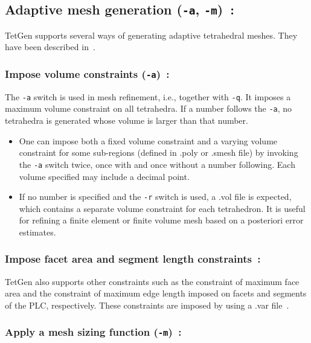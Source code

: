 \documentclass[12pt,twoside,a4paper]{article}
\numberwithin{equation}{section}
\newcommand{\tetq}{\texttt{-q}}
\newcommand{\tetr}{\texttt{-r}}
\newcommand{\teta}{\texttt{-a}}
\newcommand{\tetm}{\texttt{-m}}
\begin{document}
\subsection[Adaptive mesh generation]
{Adaptive mesh generation (\teta{}, \tetm{})~\cite[pp. 41--43]{Si2013}:}

TetGen supports several ways of generating adaptive tetrahedral meshes.
They have been described in~\cite[pp. 13--15]{Si2013}.

\subsubsection[Impose volume constraints]
{Impose volume constraints (\teta{})~\cite[pp. 41]{Si2013}:} 

The \teta{} switch is used in mesh refinement, i.e., together with
\tetq{}. It imposes a maximum volume constraint on all tetrahedra. If a
number follows the \teta{}, no tetrahedra is generated whose volume is
larger than that number.

\begin{itemize}
\item One can impose both a fixed volume constraint and a varying volume
  constraint for some sub-regions (defined in .poly or .smesh file) by
  invoking the \teta{} switch twice, once with and once without a number
  following. Each volume specified may include a decimal point.
\item If no number is specified and the \tetr{} switch is used, a .vol file
  is expected, which contains a separate volume constraint for each tetrahedron. It is useful for refining a finite element or finite volume mesh
  based on a posteriori error estimates.
\end{itemize}

\subsubsection[Impose facet area and segment length constraints]
{Impose facet area and segment length constraints~\cite[p. 42]{Si2013}:}

TetGen also supports other constraints such as the constraint of maximum
face area and the constraint of maximum edge length imposed on facets and
segments of the PLC, respectively.  These constraints are imposed by using a
.var file~\cite[p. 65]{Si2013}.

\subsubsection[Apply a mesh sizing function]
{Apply a mesh sizing function (\tetm{})~\cite[p. 42]{Si2013}:}
  
\end{document}
